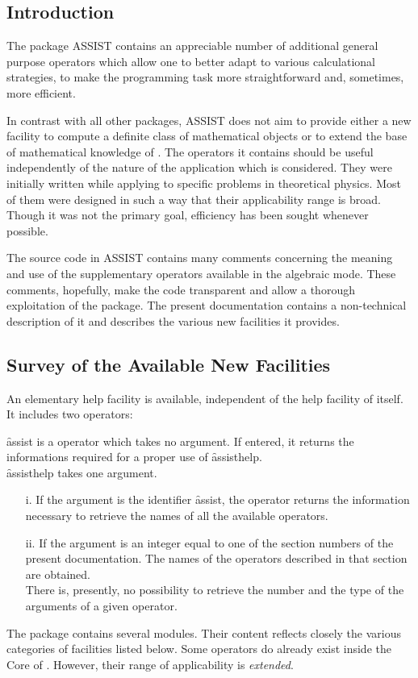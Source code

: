


\subsection{Introduction}
The package \textsc{ASSIST} contains
an appreciable number of additional general purpose operators which allow
one to better adapt \REDUCE to various calculational strategies,
to make the programming task more straightforward and, sometimes, 
more efficient.

In contrast with all other packages, \textsc{ASSIST} does not aim to provide either a
new facility to compute a definite class of mathematical objects or to extend
the base of mathematical knowledge of \REDUCE.
The operators it contains should be
useful independently of the nature of the application which is considered.
They were initially written while applying \REDUCE to specific problems in
theoretical physics. Most of them were designed
in such a way that their applicability range is broad. Though it was not
the primary goal, efficiency has been sought whenever possible.

The source code in \textsc{ASSIST} contains many comments concerning
the meaning and use of the supplementary operators available
in the algebraic mode. These comments, hopefully, make the code transparent
and allow a thorough exploitation of the package. The present documentation
contains a non-technical description of it and describes the
various new facilities it provides.

\subsection{Survey of the Available New Facilities}
An elementary help facility is available, independent of the
help facility of \REDUCE itself. It includes two operators:

\hypertarget{operator:ASSIST}{}
\hypertarget{operator:ASSISTHELP}{}
\f{assist} is a operator which takes no argument. If entered, it returns 
the informations required for a proper use  of \f{assisthelp}.\\   
\f{assisthelp} takes one argument.
\begin{itemize}
\item[i.] If the argument is the identifier \f{assist}, the operator 
returns the information necessary to retrieve the names of all the available
operators.
\item[ii.] If the argument is an integer equal to one of the section numbers
of the present documentation. The names of the operators described
in that section are obtained.\\
There is, presently, no possibility to retrieve the number and the type of 
the arguments of a given operator.
\end{itemize}
The package contains several modules. Their content reflects closely
the various categories of facilities listed below. Some operators do
already exist inside the Core of \REDUCE. However, their range
of applicability is \emph{extended}.

